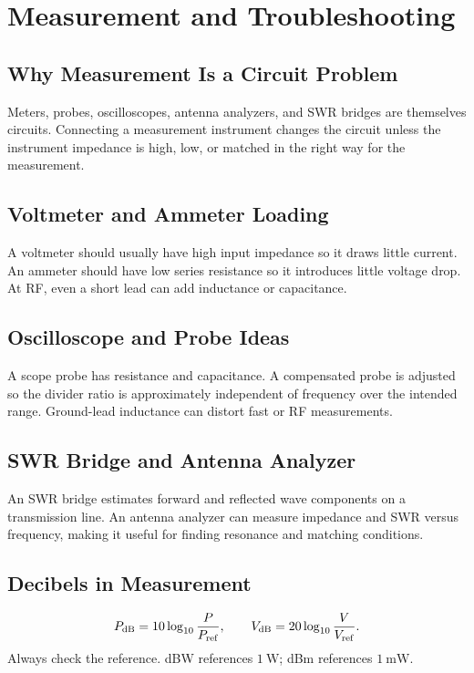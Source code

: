 \chapter{Measurement and Troubleshooting}
\section{Why Measurement Is a Circuit Problem}
Meters, probes, oscilloscopes, antenna analyzers, and SWR bridges are themselves
circuits. Connecting a measurement instrument changes the circuit unless the
instrument impedance is high, low, or matched in the right way for the
measurement.

\section{Voltmeter and Ammeter Loading}
A voltmeter should usually have high input impedance so it draws little current.
An ammeter should have low series resistance so it introduces little voltage
drop. At RF, even a short lead can add inductance or capacitance.

\section{Oscilloscope and Probe Ideas}
A scope probe has resistance and capacitance. A compensated probe is adjusted so
the divider ratio is approximately independent of frequency over the intended
range. Ground-lead inductance can distort fast or RF measurements.

\section{SWR Bridge and Antenna Analyzer}
An SWR bridge estimates forward and reflected wave components on a transmission
line. An antenna analyzer can measure impedance and SWR versus frequency, making
it useful for finding resonance and matching conditions.

\section{Decibels in Measurement}
\[
P_{\mathrm{dB}}=10\log_{10}\frac{P}{P_{\mathrm{ref}}},
\qquad
V_{\mathrm{dB}}=20\log_{10}\frac{V}{V_{\mathrm{ref}}}.
\]
Always check the reference. dBW references \(\SI{1}{\watt}\); dBm references
\(\SI{1}{\milli\watt}\).

